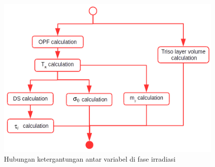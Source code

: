\documentclass[a4paper,11pt]{report}
\begin{document}
\begin{figure}[h]
  \begin{center}
    \includegraphics[scale=.5]{pics/irrCalculation.png}
    \caption{Hubungan ketergantungan antar variabel di fase irradiasi}
    \label{fig:irradiasi}
  \end{center}
\end{figure}
\end{document}
